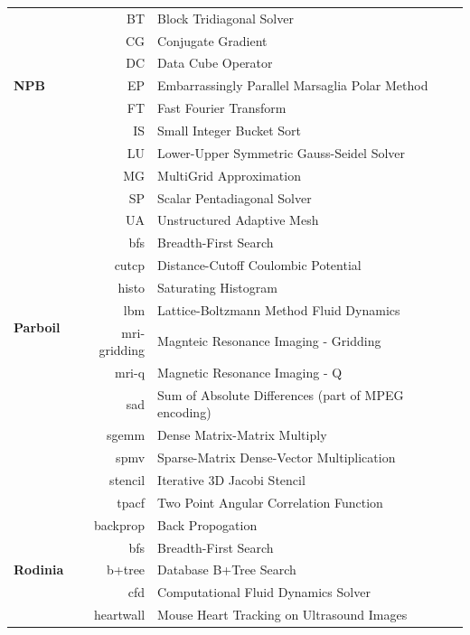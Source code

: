 \begin{table}[H]
\centering
\begin{tabular}{|l|r|l|}
\hline
\multirow{7}{*}{\bf NPB}
 & BT & Block Tridiagonal Solver\\[-2.4mm]
 & CG & Conjugate Gradient\\[-2.4mm]
 & DC & Data Cube Operator\\[-2.4mm]
 & EP & Embarrassingly Parallel Marsaglia Polar Method\\[-2.4mm]
 & FT & Fast Fourier Transform\\[-2.4mm]
 & IS & Small Integer Bucket Sort \\[-2.4mm]
 & LU & Lower-Upper Symmetric Gauss-Seidel Solver\\[-2.4mm]
 & MG & MultiGrid Approximation\\[-2.4mm]
 & SP & Scalar Pentadiagonal Solver\\[-2.4mm]
 & UA & Unstructured Adaptive Mesh\\
\hline
\multirow{7}{*}{\bf Parboil}
 & bfs          & Breadth-First Search\\[-2.4mm]
 & cutcp        & Distance-Cutoff Coulombic Potential\\[-2.4mm]
 & histo        & Saturating Histogram\\[-2.4mm]
 & lbm          & Lattice-Boltzmann Method Fluid Dynamics\\[-2.4mm]
 & mri-gridding & Magnteic Resonance Imaging - Gridding\\[-2.4mm]
 & mri-q        & Magnetic Resonance Imaging - Q\\[-2.4mm]
 & sad          & Sum of Absolute Differences (part of MPEG encoding)\\[-2.4mm]
 & sgemm        & Dense Matrix-Matrix Multiply\\[-2.4mm]
 & spmv         & Sparse-Matrix Dense-Vector Multiplication\\[-2.4mm]
 & stencil      & Iterative 3D Jacobi Stencil\\[-2.4mm]
 & tpacf        & Two Point Angular Correlation Function\\
\hline
\multirow{12}{*}{\bf Rodinia}
 & backprop       & Back Propogation\\[-2.4mm]
 & bfs            & Breadth-First Search\\[-2.4mm]
 & b+tree         & Database B+Tree Search\\[-2.4mm]
 & cfd            & Computational Fluid Dynamics Solver\\[-2.4mm]
 & heartwall      & Mouse Heart Tracking on Ultrasound Images\\[-2.4mm]

\end{tabular}
\end{table}
